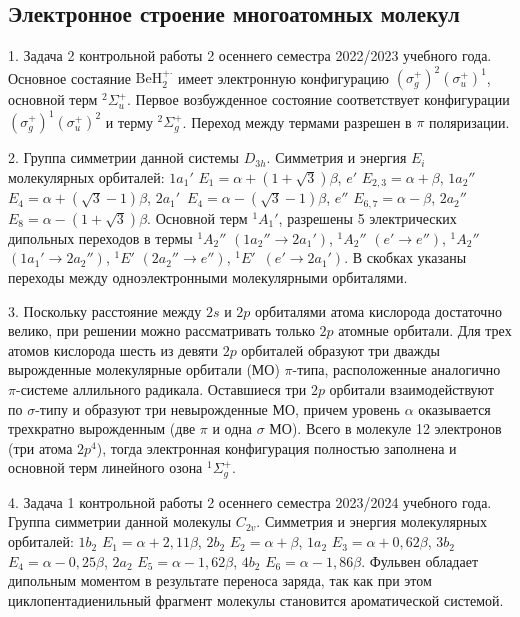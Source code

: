 \subsection{Электронное строение многоатомных молекул}
1. Задача 2 контрольной работы 2 осеннего семестра 2022/2023 учебного года. Основное состаяние $\text{BeH}_2^{+\boldsymbol{\cdot}}$ имеет электронную конфигурацию $(\sigma_g^+)^2 (\sigma_u^+)^1$, основной терм $^2\Sigma_u^+$. Первое возбужденное состояние соответствует конфигурации $(\sigma_g^+)^1 (\sigma_u^+)^2$ и терму $^2\Sigma_g^+$. Переход между термами разрешен в $\pi$ поляризации.\par
2. Группа симметрии данной системы $D_{3h}$. Симметрия и энергия $E_i$ молекулярных орбиталей: $1a_1'$ $E_1=\alpha+(1+\sqrt3)\beta$, $e'$ $E_{2,3}=\alpha+\beta$, $1a_2''$ $E_4=\alpha+(\sqrt3-1)\beta$, $2a_1'$~$E_4=\alpha-(\sqrt3-1)\beta$, $e''$ $E_{6,7}=\alpha-\beta$, $2a_2''$~$E_8=\alpha-(1+\sqrt3)\beta$. Основной терм $^1A_1'$, разрешены 5 электрических дипольных переходов в термы $^1A_2''$ $(1a_2'' \rightarrow 2a_1')$, $^1A_2''$ $(e' \rightarrow e'')$, $^1A_2''$ $(1a_1' \rightarrow 2a_2'')$, $^1E'$ $(2a_2'' \rightarrow e'')$, $^1E'$~$(e' \rightarrow 2a_1')$. В скобках указаны переходы между одноэлектронными молекулярными орбиталями.\par
3. Поскольку расстояние между  $2s$ и $2p$ орбиталями атома кислорода достаточно велико, при решении можно рассматривать только $2p$ атомные орбитали. Для трех атомов кислорода шесть из девяти $2p$ орбиталей образуют три дважды вырожденные молекулярные орбитали (МО) $\pi$-типа, расположенные аналогично $\pi$-системе аллильного радикала. Оставшиеся три $2p$ орбитали взаимодействуют по $\sigma$-типу и образуют три невырожденные МО, причем уровень $\alpha$ оказывается трехкратно вырожденным (две $\pi$ и одна $\sigma$ МО). Всего в молекуле 12 электронов (три атома $2p^4$), тогда электронная конфигурация полностью заполнена и основной терм линейного озона $^1\Sigma_g^+$. \par
4. Задача 1 контрольной работы 2 осеннего семестра 2023/2024 учебного года. Группа симметрии данной молекулы $C_{2v}$. Симметрия и энергия молекулярных орбиталей: $1b_2$ $E_1=\alpha+2,11\beta$, $2b_2$ $E_2=\alpha+\beta$, $1a_2$ $E_3=\alpha+0,62\beta$, $3b_2$ $E_4=\alpha-0,25\beta$, $2a_2$ $E_5=\alpha-1,62\beta$, $4b_2$ $E_6=\alpha-1,86\beta$. Фульвен обладает дипольным моментом в результате переноса заряда, так как при этом циклопентадиенильный фрагмент молекулы становится ароматической системой.\par
